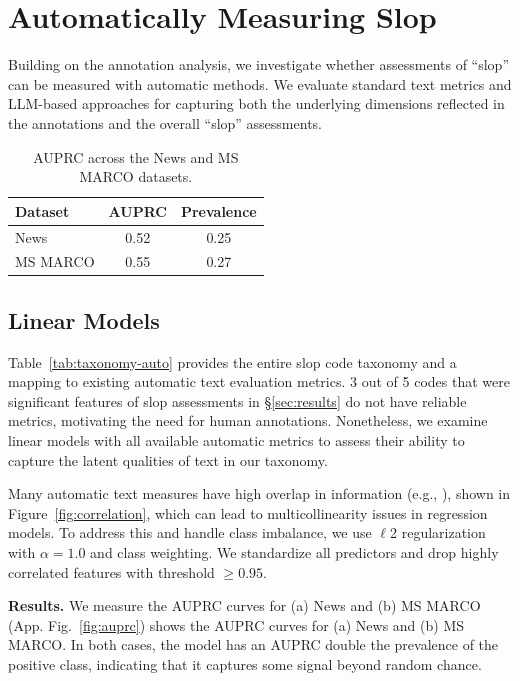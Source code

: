 \documentclass{article} %
\begin{document}
\section{Automatically Measuring Slop}
\label{sec:auto_slop}
Building on the annotation analysis, we investigate whether assessments of ``slop'' can be measured with automatic methods. We evaluate standard text metrics and LLM-based approaches for capturing both the underlying dimensions reflected in the annotations and the overall ``slop'' assessments.  
\begin{table}
    \centering
    \vspace{1.0em}
    \begin{tabular}{lcc}
        \toprule
        \textbf{Dataset} & \textbf{AUPRC} & \textbf{Prevalence} \\
        \midrule
        News      & 0.52 & 0.25 \\
        MS MARCO  & 0.55 & 0.27 \\
        \bottomrule
    \end{tabular}
    \caption{AUPRC across the News and MS MARCO datasets.}
    \label{tab:auprc-results}
    \vspace{-0.9em}
\end{table}
\subsection{Linear Models}

Table~\ref{tab:taxonomy-auto} provides the entire slop code taxonomy and a mapping to existing automatic text evaluation metrics. 3 out of 5 codes that were significant features of slop assessments in \S\ref{sec:results} do not have reliable metrics, motivating the need for human annotations. 
Nonetheless, we examine linear models with all available automatic metrics to assess their ability to capture the latent qualities of text in our taxonomy.

Many automatic text measures have high overlap in information (e.g., \citealp{shaib2024standardizing}), shown in Figure~\ref{fig:correlation}, which can lead to multicollinearity issues in regression models. 
To address this and handle class imbalance, we use $\ell$2 regularization with $\alpha=1.0$ and class weighting. 
We standardize all predictors and drop highly correlated features with threshold $\geq 0.95$.

\textbf{Results.} We measure the AUPRC curves for (a) News and (b) MS MARCO (App. Fig.~\ref{fig:auprc}) shows the AUPRC curves for (a) News and (b) MS MARCO. 
In both cases, the model has an AUPRC double the prevalence of the positive class, indicating that it  captures some signal beyond random chance. 
\end{document}
